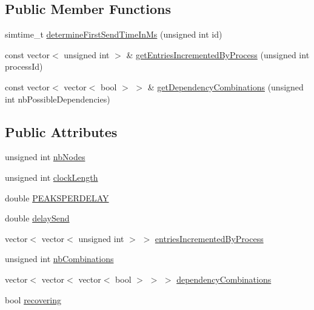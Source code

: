 \subsection*{Public Member Functions}
\begin{DoxyCompactItemize}
\item 
simtime\+\_\+t \hyperlink{classSimulationParameters_acf83b84e172a799e1db3bf9554c4787f}{determine\+First\+Send\+Time\+In\+Ms} (unsigned int id)
\item 
const vector$<$ unsigned int $>$ \& \hyperlink{classSimulationParameters_aec302fa13d17be02d116829100ccbf70}{get\+Entries\+Incremented\+By\+Process} (unsigned int process\+Id)
\item 
const vector$<$ vector$<$ bool $>$ $>$ \& \hyperlink{classSimulationParameters_a39008b8c9ed5c7c27dbfe7c5355d8062}{get\+Dependency\+Combinations} (unsigned int nb\+Possible\+Dependencies)
\end{DoxyCompactItemize}
\subsection*{Public Attributes}
\begin{DoxyCompactItemize}
\item 
unsigned int \hyperlink{classSimulationParameters_a96391a1b611de11ca4d0babba7117872}{nb\+Nodes}
\item 
unsigned int \hyperlink{classSimulationParameters_a34b25081ba9b20aa461c03ab3ade034b}{clock\+Length}
\item 
double \hyperlink{classSimulationParameters_a57cd536ac7c057b5c2d5c85faa4d846d}{P\+E\+A\+K\+S\+P\+E\+R\+D\+E\+L\+AY}
\item 
double \hyperlink{classSimulationParameters_ae02521fdf6d81eff5e620a6a021106d3}{delay\+Send}
\item 
vector$<$ vector$<$ unsigned int $>$ $>$ \hyperlink{classSimulationParameters_a069a04754400916fc6b5f9f5baff2d32}{entries\+Incremented\+By\+Process}
\item 
unsigned int \hyperlink{classSimulationParameters_a8f1c0671b131ea807d8a04cd9b15d9b8}{nb\+Combinations}
\item 
vector$<$ vector$<$ vector$<$ bool $>$ $>$ $>$ \hyperlink{classSimulationParameters_a1e884901020cad738db1aceaa6700d9f}{dependency\+Combinations}
\item 
bool \hyperlink{classSimulationParameters_a637db4137ba6b25de7e75db1582d6532}{recovering}
\end{DoxyCompactItemize}
